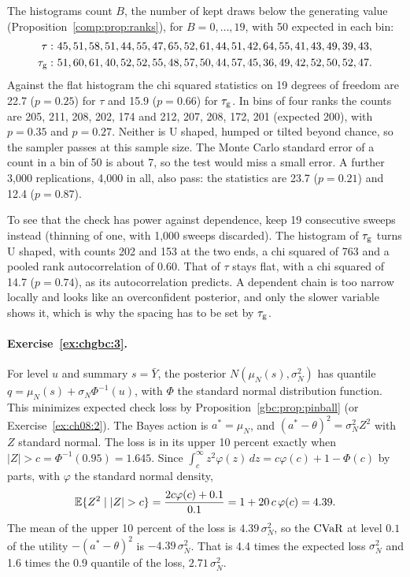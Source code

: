 The histograms count $B$, the number of kept draws below the generating value (Proposition~\ref{comp:prop:ranks}), for $B = 0, \dots, 19$, with 50 expected in each bin:
\begin{align*}
\tau:\ & 45, 51, 58, 51, 44, 55, 47, 65, 52, 61, 44, 51, 42, 64, 55, 41, 43, 49, 39, 43, \\
\tau_{\mathrm{g}}:\ & 51, 60, 61, 40, 52, 52, 55, 48, 57, 50, 44, 57, 45, 36, 49, 42, 52, 50, 52, 47.
\end{align*}
Against the flat histogram the chi squared statistics on 19 degrees of freedom are 22.7 ($p = 0.25$) for $\tau$ and 15.9 ($p = 0.66$) for $\tau_{\mathrm{g}}$. In bins of four ranks the counts are 205, 211, 208, 202, 174 and 212, 207, 208, 172, 201 (expected 200), with $p = 0.35$ and $p = 0.27$. Neither is U shaped, humped or tilted beyond chance, so the sampler passes at this sample size. The Monte Carlo standard error of a count in a bin of 50 is about 7, so the test would miss a small error. A further 3,000 replications, 4,000 in all, also pass: the statistics are 23.7 ($p = 0.21$) and 12.4 ($p = 0.87$).

To see that the check has power against dependence, keep 19 consecutive sweeps instead (thinning of one, with 1,000 sweeps discarded). The histogram of $\tau_{\mathrm{g}}$ turns U shaped, with counts 202 and 153 at the two ends, a chi squared of 763 and a pooled rank autocorrelation of 0.60. That of $\tau$ stays flat, with a chi squared of 14.7 ($p = 0.74$), as its autocorrelation predicts. A dependent chain is too narrow locally and looks like an overconfident posterior, and only the slower variable shows it, which is why the spacing has to be set by $\tau_{\mathrm{g}}$.

\paragraph{Exercise~\ref{ex:chgbc:3}.} For level $u$ and summary $s=\bar Y$, the posterior $N(\mu_N(s),\sigma_N^2)$ has quantile $q=\mu_N(s)+\sigma_N\Phi^{-1}(u)$, with $\Phi$ the standard normal distribution function. This minimizes expected check loss by Proposition~\ref{gbc:prop:pinball} (or Exercise~\ref{ex:ch08:2}). The Bayes action is $a^\ast = \mu_N$, and $(a^\ast - \theta)^2 = \sigma_N^2Z^2$ with $Z$ standard normal. The loss is in its upper 10 percent exactly when $|Z| > c = \Phi^{-1}(0.95) = 1.645$. Since $\int_c^\infty z^2\varphi(z)\,dz = c\varphi(c) + 1 - \Phi(c)$ by parts, with $\varphi$ the standard normal density,
\[
\mathbb{E}\{Z^2 \mid |Z| > c\} = \frac{2c\varphi(c) + 0.1}{0.1} = 1 + 20\,c\,\varphi(c) = 4.39.
\]
The mean of the upper 10 percent of the loss is $4.39\,\sigma_N^2$, so the $\mathrm{CVaR}$ at level $0.1$ of the utility $-(a^\ast - \theta)^2$ is $-4.39\,\sigma_N^2$. That is 4.4 times the expected loss $\sigma_N^2$ and 1.6 times the 0.9 quantile of the loss, $2.71\,\sigma_N^2$.

